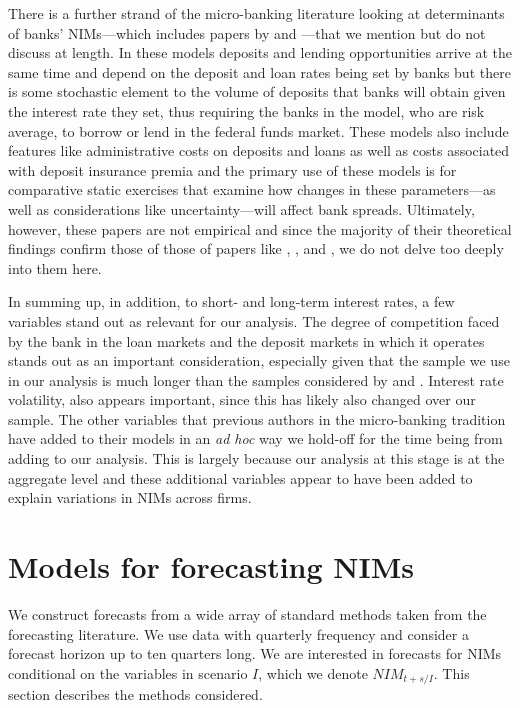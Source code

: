 \documentclass[11pt]{article}
\begin{document}
There is a further strand of the micro-banking literature looking at determinants of banks' NIMs---which includes papers by  and ---that we mention but do not discuss at length.  In these models deposits and lending opportunities arrive at the same time and depend on the deposit and loan rates being set by banks but there is some stochastic element to the volume of deposits that banks will obtain given the interest rate they set, thus requiring the banks in the model, who are risk average, to borrow or lend in the federal funds market.  These models also include features like administrative costs on deposits and loans as well as costs associated with deposit insurance premia and the primary use of these models is for comparative static exercises that examine how changes in these parameters---as well as considerations like uncertainty---will affect bank spreads.  Ultimately, however, these papers are not empirical and since the majority of their theoretical findings confirm those of those of papers like , , and , we do not delve too deeply into them here.

In summing up, in addition, to short- and long-term interest rates, a few variables stand out as relevant for our analysis.  The degree of competition faced by the bank in the loan markets and the deposit markets in which it operates stands out as an important consideration, especially given that the sample we use in our analysis is much longer than the samples considered by  and .  Interest rate volatility, also appears important, since this has likely also changed over our sample.  The other variables that previous authors in the micro-banking tradition have added to their models in an \textit{ad hoc} way we hold-off for the time being from adding to our analysis.  This is largely because our analysis at this stage is at the aggregate level and these additional variables appear to have been added to explain variations in NIMs across firms.

\section{Models for forecasting NIMs}

We construct forecasts from a wide array of standard methods taken from the forecasting literature. We use data with quarterly frequency and consider a forecast horizon up to ten quarters long. We are interested in forecasts for NIMs conditional on the variables in scenario $I$, which we denote $NIM_{t+s/I}$. This section describes the methods considered.
\end{document}
